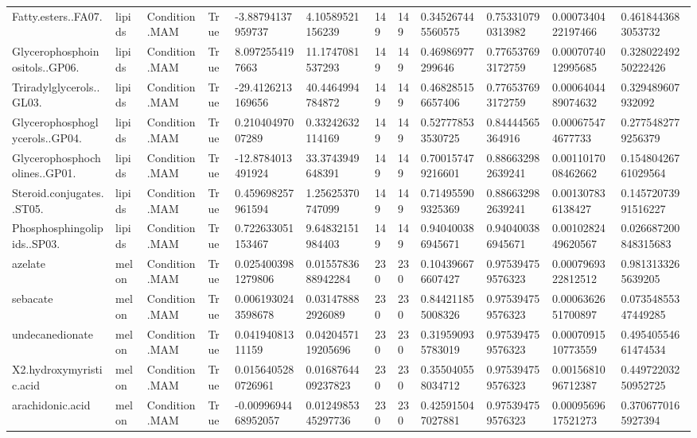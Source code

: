 \begin{longtable}{llllllllllll}
Fatty.esters..FA07. & lipids & Condition.MAM & True & -3.88794137959737 & 4.10589521156239 & 149 & 149 & 0.345267445560575 & 0.753310790313982 & 0.0007340422197466 & 0.4618443683053732 \\
Glycerophosphoinositols..GP06. & lipids & Condition.MAM & True & 8.0972554197663 & 11.1747081537293 & 149 & 149 & 0.46986977299646 & 0.776537693172759 & 0.0007074012995685 & 0.32802249250222426 \\
Triradylglycerols..GL03. & lipids & Condition.MAM & True & -29.4126213169656 & 40.4464994784872 & 149 & 149 & 0.468285156657406 & 0.776537693172759 & 0.0006404489074632 & 0.329489607932092 \\
Glycerophosphoglycerols..GP04. & lipids & Condition.MAM & True & 0.21040497007289 & 0.33242632114169 & 149 & 149 & 0.527778533530725 & 0.84444565364916 & 0.000675474677733 & 0.2775482779256379 \\
Glycerophosphocholines..GP01. & lipids & Condition.MAM & True & -12.8784013491924 & 33.3743949648391 & 149 & 149 & 0.700157479216601 & 0.886632982639241 & 0.0011017008462662 & 0.15480426761029564 \\
Steroid.conjugates..ST05. & lipids & Condition.MAM & True & 0.459698257961594 & 1.25625370747099 & 149 & 149 & 0.714955909325369 & 0.886632982639241 & 0.001307836138427 & 0.14572073991516227 \\
Phosphosphingolipids..SP03. & lipids & Condition.MAM & True & 0.722633051153467 & 9.64832151984403 & 149 & 149 & 0.940400386945671 & 0.940400386945671 & 0.0010282449620567 & 0.026687200848315683 \\
azelate & melon & Condition.MAM & True & 0.0254003981279806 & 0.0155783688942284 & 230 & 230 & 0.104396676607427 & 0.975394759576323 & 0.0007969322812512 & 0.9813133265639205 \\
sebacate & melon & Condition.MAM & True & 0.0061930243598678 & 0.031478882926089 & 230 & 230 & 0.844211855008326 & 0.975394759576323 & 0.0006362651700897 & 0.07354855347449285 \\
undecanedionate & melon & Condition.MAM & True & 0.04194081311159 & 0.0420457119205696 & 230 & 230 & 0.319590935783019 & 0.975394759576323 & 0.0007091510773559 & 0.49540554661474534 \\
X2.hydroxymyristic.acid & melon & Condition.MAM & True & 0.0156405280726961 & 0.0168764409237823 & 230 & 230 & 0.355040558034712 & 0.975394759576323 & 0.0015681096712387 & 0.44972203250952725 \\
arachidonic.acid & melon & Condition.MAM & True & -0.0099694468952057 & 0.0124985345297736 & 230 & 230 & 0.425915047027881 & 0.975394759576323 & 0.0009569617521273 & 0.3706770165927394 \\

\end{longtable}
